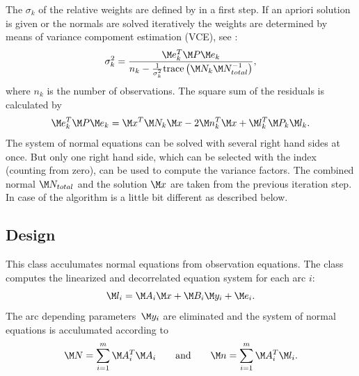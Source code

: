 The $\sigma_k$ of the relative weights are defined by 
in a first step. If an apriori solution  is
given or the normals are solved iteratively the weights are determined by means
of variance compoment estimation (VCE), see :
\begin{equation}
\sigma_k^2 =
\frac{\M e_k^T\M P\M e_k}
{n_k-\frac{1}{\sigma_k^2}\text{trace}\left(\M N_k\M N_{total}^{-1}\right)},
\end{equation}
where $n_k$ is the number of observations. The square sum of the residuals
is calculated by
\begin{equation}
\M e_k^T\M P\M e_k = \M x^T\M N_k\M x - 2\M n_k^T\M x + \M l_k^T\M P_k\M l_k.
\end{equation}
The system of normal equations can be solved with several right hand sides at once. But
only one right hand side, which can be selected with the index 
(counting from zero), can be used to compute the variance factors.
The combined normal $\M N_{total}$ and the solution $\M x$ are taken from the previous
iteration step. In case of  the algorithm
is a little bit different as described below.


\subsection{Design}\label{normalEquationType:design}
This class acculumates normal equations from observation equations.
The class  computes
the linearized and decorrelated equation system for each arc $i$:
\begin{equation}
\M l_i  = \M A_i \M x + \M B_i \M y_i + \M e_i.
\end{equation}
The arc depending parameters~$\M y_i$ are eliminated and the system of normal
equations is acculumated according to
\begin{equation}
 \M N = \sum_{i=1}^m \M A_i^T  \M A_i
 \qquad\text{and}\qquad
\M n = \sum_{i=1}^m \M A_i^T \M l_i.
\end{equation}


